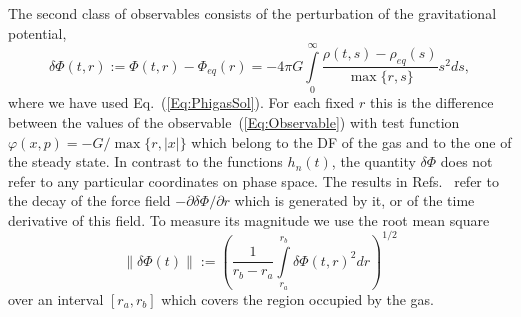 The second class of observables consists of the perturbation of the gravitational potential,
\begin{equation}
\delta\Phi(t,r) := \Phi(t,r) - \Phi_{eq}(r)
 = -4\pi G\int\limits_0^\infty \frac{\rho(t,s) - \rho_{eq}(s)}{\max\{ r,s \}} s^2 ds,
\label{Eq:deltaPhi}
\end{equation}
where we have used Eq.~(\ref{Eq:PhigasSol}). For each fixed $r$ this is the difference between the values of the observable~(\ref{Eq:Observable}) with test function $\varphi(x,p) = -G/\max\{ r,|x| \}$ which belong to the DF of the gas and to the one of the steady state. In contrast to the functions $h_n(t)$, the quantity $\delta\Phi$ does not refer to any particular coordinates on phase space. The results in Refs.~\cite{mHgRmScS25,mHmS25} refer to the decay of the force field $-\partial\delta\Phi/\partial r$ which is generated by it, or of the time derivative of this field. To measure its magnitude we use the root mean square
\begin{equation}
\| \delta\Phi(t) \| := \left( \frac{1}{r_b - r_a}\int\limits_{r_a}^{r_b} \delta\Phi(t,r)^2 dr \right)^{1/2}
\label{Eq:deltaPhiNorm}
\end{equation}
over an interval $[r_a,r_b]$ which covers the region occupied by the gas.
